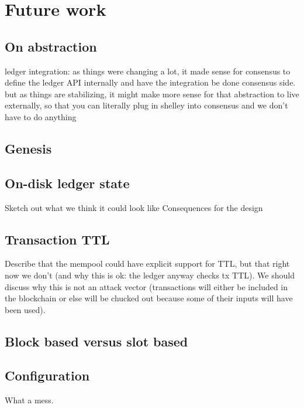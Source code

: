 \chapter{Future work}

\section{On abstraction}

ledger integration: as things were changing a lot, it made sense for consensus to define the ledger API internally and have the integration be done consensus side. but as things are stabilizing, it might make more sense for that abstraction to live externally, so that you can literally plug in shelley into consensus and we don't have to do anything

\section{Genesis}
\label{future:genesis}

\section{On-disk ledger state}

\duncan

Sketch out what we think it could look like
Consequences for the design

\section{Transaction TTL}
\label{future:ttl}

Describe that the mempool could have explicit support for TTL, but that right now we don't (and why this is ok: the ledger anyway checks tx TTL). We should discuss why this is not an attack vector (transactions will either be included in the blockchain or else will be chucked out because some of their inputs will have been used).

\section{Block based versus slot based}
\label{future:block-vs-slot}

\section{Configuration}

What a mess.

